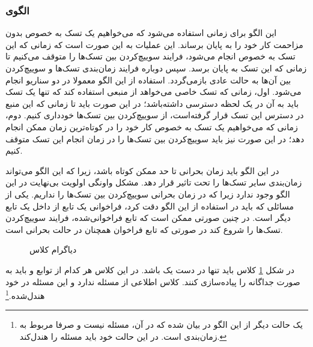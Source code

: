 \subsubsection{الگوی }
\label{scheduleCriticalRegSec}
\begin{RTL}
این الگو \cite{ref1} برای زمانی استفاده می‌شود که می‌خواهیم یک تسک به خصوص بدون مزاحمت کار
خود را به پایان برساند. این عملیات به این صورت است که زمانی که این تسک
به خصوص انجام می‌شود، فرایند سوییچ‌کردن بین تسک‌ها را متوقف می‌کنیم تا زمانی که
این تسک به پایان برسد. سپس دوباره فرایند زمان‌بندی تسک‌ها و سوییچ‌کردن بین آن‌ها
به حالت عادی بازمی‌گردد. استفاده از این الگو معمولا در دو سناریو انجام می‌شود.
اول، زمانی که تسک خاصی می‌خواهد از منبعی استفاده کند که تنها یک تسک باید
به آن در یک لحظه دسترسی داشته‌باشد؛ در این صورت باید تا زمانی که این منبع
در دسترس این تسک قرار گرفته‌است، از سوییچ‌کردن بین تسک‌ها خودداری کنیم.
دوم، زمانی که می‌خواهیم یک تسک به خصوص کار خود را در کوتاه‌ترین زمان ممکن
انجام دهد؛ در این صورت نیز باید سوییچ‌کردن بین تسک‌ها را در زمان انجام
این تسک متوقف کنیم.
\end{RTL}
\begin{RTL}
در این الگو باید زمان بحرانی تا حد ممکن کوتاه باشد، زیرا که این الگو
می‌تواند زمان‌بندی سایر تسک‌ها را تحت تاثیر قرار دهد. مشکل واونگی اولویت بی‌نهایت
در این الگو وجود ندارد زیرا که در زمان بحرانی سوییچ‌کردن بین تسک‌ها را نداریم.
یکی از مسائلی که باید در استفاده از این الگو دقت کرد، فراخوانی 
یک تابع از داخل  یک تابع دیگر است.
در چنین صورتی ممکن است که تابع فراخوانی‌شده، فرایند سوییچ‌کردن تسک‌ها را شروع
کند در صورتی که تابع فراخوان همچنان در حالت بحرانی است.
\end{RTL}
\begin{figure}[h!]
\centering
{}
\caption{دیاگرام کلاس }
\label{ConCriticalClassDiag}
\end{figure}
\begin{RTL}
در شکل \ref{ConCriticalClassDiag} کلاس
 باید
تنها در دست یک  باشد. در این کلاس هر کدام از
توابع  و  باید به صورت
جداگانه  را پیاده‌سازی کنند.
کلاس  اطلاعی از مسئله
 ندارد و این مسئله در خود
 هندل‌شده.\footnote{یک حالت دیگر
از این الگو در \cite{ref1} بیان شده که در آن، مسئله
 نیست و صرفا مربوط به زمان‌بندی است.
در این حالت خود  باید مسئله 
را هندل‌کند.}
\end{RTL}